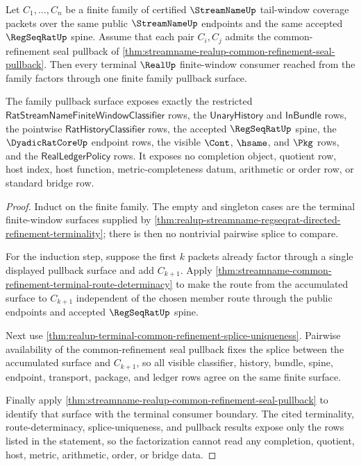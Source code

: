\begin{theorem}
\label{thm:realup-terminal-refinement-family-pullback-exhaustion}
Let $C_1,\ldots,C_n$ be a finite family of certified $\StreamNameUp$
tail-window coverage packets over the same public $\StreamNameUp$ endpoints
and the same accepted $\RegSeqRatUp$ spine. Assume that each pair
$C_i,C_j$ admits the common-refinement seal pullback of
\autoref{thm:streamname-realup-common-refinement-seal-pullback}. Then every
terminal $\RealUp$ finite-window consumer reached from the family factors
through one finite family pullback surface.

The family pullback surface exposes exactly the restricted
$\mathsf{RatStreamNameFiniteWindowClassifier}$ rows, the
$\mathsf{UnaryHistory}$ and $\mathsf{InBundle}$ rows, the pointwise
$\mathsf{RatHistoryClassifier}$ rows, the accepted $\RegSeqRatUp$ spine, the
$\DyadicRatCoreUp$ endpoint rows, the visible $\Cont$, $\hsame$, and
$\Pkg$ rows, and the $\mathsf{RealLedgerPolicy}$ rows. It exposes no
completion object, quotient row, host index, host function,
metric-completeness datum, arithmetic or order row, or standard bridge row.
\end{theorem}
\begin{proof}
Induct on the finite family. The empty and singleton cases are the terminal
finite-window surfaces supplied by
\autoref{thm:realup-streamname-regseqrat-directed-refinement-terminality};
there is then no nontrivial pairwise splice to compare.

For the induction step, suppose the first $k$ packets already factor through a
single displayed pullback surface and add $C_{k+1}$. Apply
\autoref{thm:streamname-common-refinement-terminal-route-determinacy} to make
the route from the accumulated surface to $C_{k+1}$ independent of the chosen
member route through the public endpoints and accepted $\RegSeqRatUp$ spine.

Next use
\autoref{thm:realup-terminal-common-refinement-splice-uniqueness}. Pairwise
availability of the common-refinement seal pullback fixes the splice between
the accumulated surface and $C_{k+1}$, so all visible classifier, history,
bundle, spine, endpoint, transport, package, and ledger rows agree on the
same finite surface.

Finally apply \autoref{thm:streamname-realup-common-refinement-seal-pullback}
to identify that surface with the terminal consumer boundary. The cited
terminality, route-determinacy, splice-uniqueness, and pullback results expose
only the rows listed in the statement, so the factorization cannot read any
completion, quotient, host, metric, arithmetic, order, or bridge data.
\end{proof}
